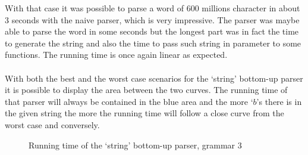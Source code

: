 With that case it was possible to parse a word of 600 millions character in about 3 seconds with the naive parser, which is very impressive.
The parser was maybe able to parse the word in some seconds but the longest part was in fact the time to generate the string and also the time to pass such string in parameter to some functions.
The running time is once again linear as expected.
\\
\\
With both the best and the worst case scenarios for the `string' bottom-up parser it is possible to display the area between the two curves.
The running time of that parser will always be contained in the blue area and the more `$b$'s there is in the given string the more the running time will follow a close curve from the worst case and conversely.

\FloatBarrier
\begin{figure}[h]
    \centering
    \caption{Running time of the `string' bottom-up parser, grammar 3}
\end{figure}
\FloatBarrier
